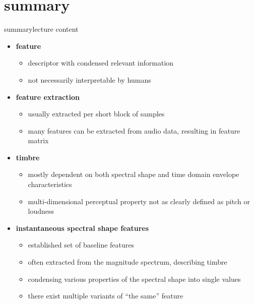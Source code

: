     \section{summary}
        \begin{frame}{summary}{lecture content}
            \vspace{-3mm}
            \begin{itemize}
                \item   \textbf{feature}
                    \begin{itemize}
                        \item   descriptor with condensed relevant information
                        \item   not necessarily interpretable by humans
                    \end{itemize}
                \bigskip
                \item   \textbf{feature extraction}
                    \begin{itemize}
                        \item   usually extracted per short block of samples
                        \item   many features can be extracted from audio data, resulting in feature matrix
                    \end{itemize}
                \bigskip
                \item   \textbf{timbre}
                    \begin{itemize}
                        \item   mostly dependent on both spectral shape and time domain envelope characteristics
                        \item   multi-dimensional perceptual property not as clearly defined as pitch or loudness
                    \end{itemize}

                \bigskip
                \item   \textbf{instantaneous spectral shape features}
                    \begin{itemize}
                        \item   established set of baseline features
                        \item   often extracted from the magnitude spectrum, describing timbre
                        \item   condensing various properties of the spectral shape into single values
                        \item   there exist multiple variants of ``the same'' feature
                    \end{itemize}
            \end{itemize}
        \end{frame}

